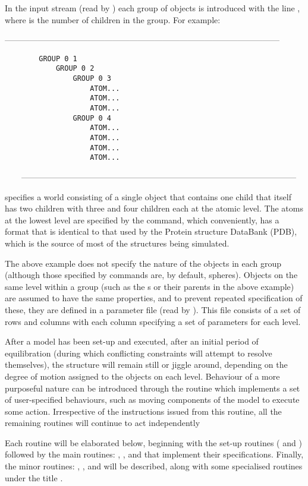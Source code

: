 In the input stream (read by )
each group of objects is introduced with the line , where  is
the number of children in the group.   For example:
\begin{singlespace}
---------------------------------------------------------------------------------------------------
\begin{verbatim}
        GROUP 0 1
            GROUP 0 2
                GROUP 0 3
                    ATOM...
                    ATOM...
                    ATOM...
                GROUP 0 4
                    ATOM...
                    ATOM...
                    ATOM...
                    ATOM...
\end{verbatim}
\ \ \ \ ---------------------------------------------------------------------------------------------------
\end{singlespace}
specifies a world consisting of a single object that contains one child that itself
has two children with three and four children each at the atomic level.  The atoms at
the lowest level are specified by the  command, which conveniently, has a
format that is identical to that used by the Protein structure DataBank (PDB), which
is the source of most of the structures being simulated.

The above example does not specify the nature of the objects in each group (although
those specified by  commands are, by default, spheres).  Objects on the same
level within a group (such as the s or their parents in the above example)
are assumed to have the same properties, and to prevent repeated specification of
these, they are defined in a parameter file (read by ).  This file consists
of a set of rows and columns with each column specifying a set of parameters for
each level.

After a model has been set-up and executed, after an initial period of equilibration
(during which conflicting constraints will attempt to resolve themselves), the structure
will remain still or jiggle around, depending on the degree of motion assigned to the
objects on each level.   Behaviour of a more purposeful nature can be introduced through
the  routine which implements a set of user-specified behaviours, such as 
moving components of the model to execute some action.   Irrespective of the instructions
issued from this routine, all the remaining routines will continue to act independently

Each routine will be elaborated below, beginning with the set-up routines (
and ) followed by the main routines: , , 
and  that implement their specifications.  Finally, the minor routines:
, ,  and  will be described, along with
some specialised routines under the title .

